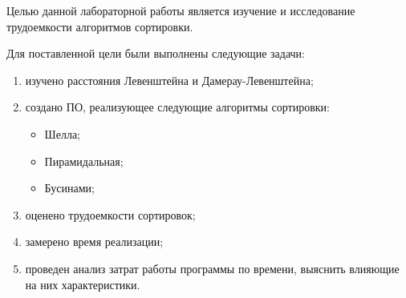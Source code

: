 Целью данной лабораторной работы является изучение и исследование трудоемкости алгоритмов сортировки.

Для поставленной цели были выполнены следующие задачи:
\begin{enumerate}[label={\arabic*)}]
	\item изучено расстояния Левенштейна и Дамерау-Левенштейна;
	\item создано ПО, реализующее следующие алгоритмы сортировки:
	\begin{itemize}
		\item Шелла;
		\item Пирамидальная;
		\item Бусинами;
	\end{itemize}
	\item оценено трудоемкости сортировок;
	\item замерено время реализации;
	\item проведен анализ затрат работы программы по времени, выяснить влияющие на них характеристики.
\end{enumerate}
